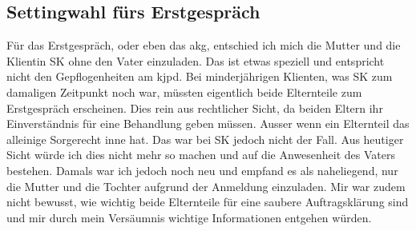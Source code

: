 \subsection{Settingwahl fürs Erstgespräch} 
Für das Erstgespräch, oder eben das \ac{akg}, entschied ich mich die Mutter und die Klientin SK ohne den Vater einzuladen. Das ist etwas speziell und entspricht nicht den Gepflogenheiten am \ac{kjpd}. Bei minderjährigen Klienten, was SK zum damaligen Zeitpunkt noch war, müssten eigentlich beide Elternteile zum Erstgespräch erscheinen. Dies rein aus rechtlicher Sicht, da beiden Eltern ihr Einverständnis für eine Behandlung geben müssen. Ausser wenn ein Elternteil das alleinige Sorgerecht inne hat. Das war bei SK jedoch nicht der Fall. Aus heutiger Sicht würde ich dies nicht mehr so machen und auf die Anwesenheit des Vaters bestehen. Damals war ich jedoch noch neu und  empfand es als naheliegend, nur die Mutter und die Tochter aufgrund der Anmeldung einzuladen. Mir war zudem nicht bewusst, wie wichtig beide Elternteile für eine saubere Auftragsklärung sind und mir durch mein Versäumnis wichtige Informationen entgehen würden.










